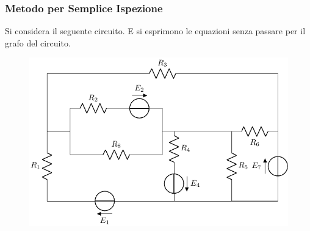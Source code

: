 \documentclass{article}
\numberwithin{equation}{subsection}
\begin{document}
\subsubsection{Metodo per Semplice Ispezione}
Si considera il seguente circuito. E si esprimono le equazioni senza passare per il grafo del circuito.
\begin{figure}[H]%
    \centering
    \includegraphics{circuito-4.pdf}%
    \label{fig:circuito-4}
\end{figure}
\end{document}
